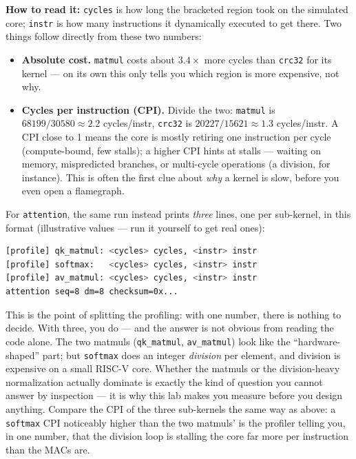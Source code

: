 \documentclass[11pt]{article}
\newcommand{\code}[1]{\texttt{#1}}
\begin{document}
\textbf{How to read it:} \code{cycles} is how long the bracketed region took
on the simulated core; \code{instr} is how many instructions it dynamically
executed to get there. Two things follow directly from these two numbers:

\begin{itemize}[nosep]
  \item \textbf{Absolute cost.} \code{matmul} costs about $3.4\times$ more
        cycles than \code{crc32} for its kernel --- on its own this only
        tells you which region is more expensive, not why.
  \item \textbf{Cycles per instruction (CPI).} Divide the two: \code{matmul}
        is $68199/30580 \approx 2.2$ cycles/instr, \code{crc32} is
        $20227/15621 \approx 1.3$ cycles/instr. A CPI close to 1 means the
        core is mostly retiring one instruction per cycle (compute-bound,
        few stalls); a higher CPI hints at stalls --- waiting on memory,
        mispredicted branches, or multi-cycle operations (a division, for
        instance). This is often the first clue about \emph{why} a kernel is
        slow, before you even open a flamegraph.
\end{itemize}

For \code{attention}, the same run instead prints \emph{three} lines, one per
sub-kernel, in this format (illustrative values --- run it yourself to get
real ones):

\begin{lstlisting}[language=bash]
[profile] qk_matmul: <cycles> cycles, <instr> instr
[profile] softmax:   <cycles> cycles, <instr> instr
[profile] av_matmul: <cycles> cycles, <instr> instr
attention seq=8 dm=8 checksum=0x...
\end{lstlisting}

This is the point of splitting the profiling: with one number, there is
nothing to decide. With three, you do --- and the answer is not obvious from
reading the code alone. The two matmuls (\code{qk\_matmul}, \code{av\_matmul})
look like the ``hardware-shaped'' part; but \code{softmax} does an integer
\emph{division} per element, and division is expensive on a small RISC-V
core. Whether the matmuls or the division-heavy normalization actually
dominate is exactly the kind of question you cannot answer by inspection ---
it is why this lab makes you measure before you design anything. Compare the
CPI of the three sub-kernels the same way as above: a \code{softmax} CPI
noticeably higher than the two matmuls' is the profiler telling you, in one
number, that the division loop is stalling the core far more per instruction
than the MACs are.
\end{document}
